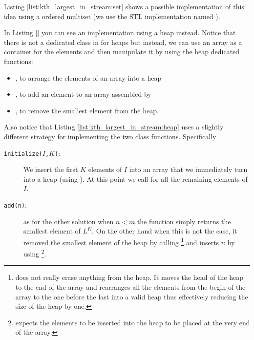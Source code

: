 Listing \ref{list:kth_largest_in_stream:set} shows a possible implementation of this idea using a
ordered multiset (we use the \CC STL implementation named ). 


In Listing \ref{} you can see an implementation using a heap instead. Notice that there is not a
dedicated class in \CC for heaps but instead, we can use an array as a container for the elements
and then manipulate it by using the heap dedicated functions: 
\begin{itemize}
	\item {}, to arrange the elements of an array into a heap
	\item {}, to add an element to an array assembled by 
	\item {}, to remove the smallest element from the heap.
\end{itemize}

Also notice that Listing \ref{list:kth_largest_in_stream:heap} uses a slightly different strategy
for implementing the two class functions. Specifically
\begin{description}
	\item[\texttt{initialize($I$,$K$)}:] We  insert the first $K$ elements of $I$ into an array that
	we immediately turn into a heap (using ). At this point we call
	 for all the remaining elements of $I$.
	\item [\texttt{add(n)}:] as for the other solution when  $n < m$ the function simply returns the
	smallest element of $L^K$. On the other hand when this is not the case, it removed the smallest
	element of the heap by calling \footnote{ does not really erase
	anything from the heap. It moves the head of the heap to the end of the array and rearranges all
	the elements  from the begin of the array to the one before the last into a valid heap thus
	effectively reducing the size of the heap by one.} and inserts $n$ by using
	\footnote{ expects the elements to be inserted into the heap
	to be placed at the very end of the array.}.
\end{description}




